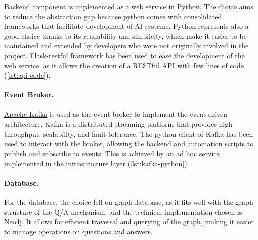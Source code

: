 \documentclass[12pt,a4paper,openright,twoside]{book}
\begin{document}

Backend component is implemented as a web service in Python. The choice aims to reduce the abstraction gap because python comes with consolidated frameworks that facilitate development of \ac{AI} systems.
%
Python represents also a good choice thanks to its readability and simplicity, which make it easier to be maintained and extended by developers who were not originally involved in the project.
%
\href{https://flask-restful.readthedocs.io/en/latest/}{Flask-restful} framework has been used to ease the development of the web service, as it allows the creation of a RESTful \ac{API} with few lines of code (\cref{lst:api-code}).





\paragraph{Event Broker.}

\href{https://kafka.apache.org/}{Apache Kafka} is used as the event broker to implement the event-driven architecture.
%
Kafka is a distributed streaming platform that provides high throughput, scalability, and fault tolerance.
%
The python client of Kafka has been used to interact with the broker, allowing the backend and automation scripts to publish and subscribe to events.
%
This is achieved by an ad hoc service implemented in the infrastructure layer (\cref{lst:kafka-python}).




\paragraph{Database.}

For the database, the choice fell on graph database, as it fits well with the graph structure of the \ac{Q/A} mechanism, and the technical implementation chosen is \href{https://neo4j.com/}{Neo4j}.
%
It allows for efficient traversal and querying of the graph, making it easier to manage operations on questions and answers.
\end{document}
